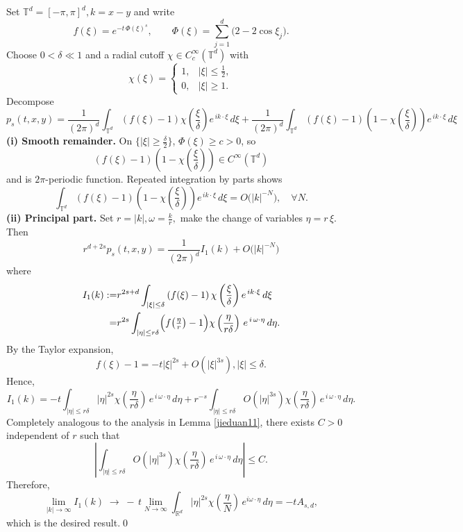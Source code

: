 \documentclass[reqno,12pt]{amsart}
\numberwithin{equation}{section}
\begin{document}
Set $\mathbb{T}^d=[-\pi,\pi]^d, k=x-y$ and write
	\[
	f(\xi)=e^{-t\,\Phi(\xi)^s},\qquad
	\Phi(\xi)=\sum_{j=1}^d\bigl(2-2\cos\xi_j\bigr).
	\]
	Choose \(0<\delta\ll1\) and a radial cutoff 
	\(\chi\in C_c^\infty(\mathbb{T}^d)\) with
	\[
	\chi(\xi)=
	\begin{cases}
		1,&|\xi|\le\tfrac12,\\
		0,&|\xi|\ge1.
	\end{cases}
	\]
	 Decompose
	\begingroup\small\[
	p_s(t,x,y)=\frac{1}{(2\pi)^d}
	\int_{\mathbb{T}^d}
\left(f(\xi)-1\right)\chi\left(\frac{\xi}{\delta}\right)e^{\,ik\cdot\xi}\,d\xi+\frac{1}{(2\pi)^d}
\int_{\mathbb{T}^d}
\left(f(\xi)-1\right)\left(1-\chi\left(\frac{\xi}{\delta}\right)\right)e^{\,ik\cdot\xi}\,d\xi
	\]\endgroup
	{\bf (i) Smooth remainder.}  On \(\{|\xi|\ge\tfrac\delta2\}\),
	\(\Phi(\xi)\ge c>0\), so 
	\[\left(f(\xi)-1\right)\left(1-\chi\left(\frac{\xi}{\delta}\right)\right)\in C^\infty(\mathbb{T}^d)\] 
	and is $2\pi$-periodic function. Repeated integration by parts shows \cite[Theorem 3.2.9]{grafakos2008classical}
	\[
\int_{\mathbb{T}^d}
\left(f(\xi)-1\right)\left(1-\chi\left(\frac{\xi}{\delta}\right)\right)e^{\,ik\cdot\xi}\,d\xi
	=O\bigl(|k|^{-N}\bigr),
	\quad\forall N.
	\]
\textbf{(ii) Principal part.}  Set $	r = |k|, \omega = \frac{k}{r},$ make the change of variables \(\eta = r\,\xi\).  Then
		\[
		r^{d+2s}	p_s(t,x,y)=\frac{1}{(2\pi)^d}I_1(k)+O\bigl(|k|^{-N}\bigr)\]
		where 
		\[
	\begin{aligned}
			I_1(k):=& r^{2s+d}
		\int_{|\xi|\le \delta}
	\left(f(\xi)-1\right)\chi\left(\frac{\xi}{\delta}\right)e^{\,ik\cdot\xi}\,d\xi
		\\=& r^{2s}
		\int_{|\eta|\le r\delta}
		\Bigl(f\bigl(\tfrac\eta r\bigr)-1\Bigr)\chi\left(\frac{\eta}{r\delta}\right)\,
		e^{\,i\,\omega\cdot\eta}\,
		d\eta.
	\end{aligned}
		\]
By the Taylor expansion,
\[f\left(\xi\right)-1=-t|\xi|^{2s}+O\left(|\xi|^{3s}\right),|\xi|\le \delta.\]
	 Hence,
	 \[I_{1}\left(k\right)=-t	\int_{|\eta|\le r\delta}
	|\eta|^{2s}\chi\left(\frac{\eta}{r\delta}\right)\,
	 e^{\,i\,\omega\cdot\eta}\,
	 d\eta+r^{-s}\int_{|\eta|\le r\delta}
	 O\left(|\eta|^{3s}\right)\chi\left(\frac{\eta}{r\delta}\right)\,
	 e^{\,i\,\omega\cdot\eta}\,
	 d\eta.\]
	 Completely analogous to the analysis in Lemma \ref{jieduan11}, there exists $C>0$ independent of $r$ such that
	 \[\left|\int_{|\eta|\le r\delta}
	 O\left(|\eta|^{3s}\right)\chi\left(\frac{\eta}{r\delta}\right)\,
	 e^{\,i\,\omega\cdot\eta}\,
	 d\eta\right|\le C.\]
	 Therefore, 
	\[
	\lim\limits_{|k|\rightarrow \infty}I_1(k)\;\longrightarrow\;
	-\,t\lim\limits_{N\rightarrow \infty}
	\int_{\mathbb{R}^d}|\eta|^{2s}\chi\left(\frac{\eta}{N}\right)\,e^{i\omega\cdot\eta}\,d\eta=-tA_{s,d},
	\]
	which is the desired result.\qed
\end{document}
